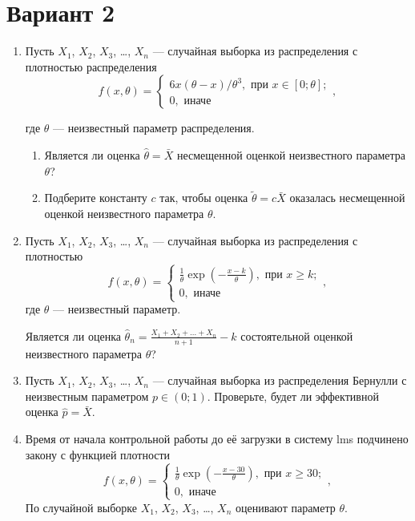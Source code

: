 \documentclass[12pt]{article}
\begin{document}
\section*{Вариант 2}
\begin{enumerate}

\item Пусть $X_1$, $X_2$, $X_3$, \ldots, $X_n$ — 
случайная выборка из распределения с плотностью распределения
\[
f(x, \theta) = \begin{cases}
  6x(\theta - x)/\theta^3, \text{ при } x\in [0;\theta]; \\
  0, \text{ иначе}
\end{cases},
\]

где $\theta$ — неизвестный параметр распределения. 

\begin{enumerate}
\item Является ли оценка $\hat\theta=\bar X$ несмещенной оценкой неизвестного параметра $\theta$?
\item Подберите константу $c$ так, 
чтобы оценка $\tilde \theta = c\bar X$ оказалась несмещенной оценкой неизвестного параметра $\theta$. 
\end{enumerate}


\item Пусть $X_1$, $X_2$, $X_3$, \ldots, $X_n$ — случайная выборка из распределения с плотностью
\[
  f(x, \theta) = \begin{cases}
    \frac{1}{\theta}\exp\left(-\frac{x-k}{\theta}\right), \text{ при } x\geq k; \\
    0, \text{ иначе}
  \end{cases},    
\]
где $\theta$ — неизвестный параметр.

Является ли оценка $\hat\theta_n = \frac{X_1 + X_2 + \ldots + X_n}{n+1} - k$ состоятельной оценкой неизвестного параметра $\theta$?



\item  Пусть $X_1$, $X_2$, $X_3$, \ldots, $X_n$ — 
случайная выборка из распределения Бернулли с неизвестным параметром $p\in (0;1)$. 
Проверьте, будет ли эффективной оценка $\hat p = \bar X$.




\item  Время от начала контрольной работы до её загрузки в систему lms  подчинено закону с функцией плотности
\[
  f(x, \theta) = \begin{cases}
    \frac{1}{\theta}\exp\left(-\frac{x-30}{\theta}\right), \text{ при } x\geq 30; \\
    0, \text{ иначе}
  \end{cases},    
\]
По случайной выборке $X_1$, $X_2$, $X_3$, \ldots, $X_n$ оценивают параметр $\theta$. 


\end{enumerate}
\end{document}
